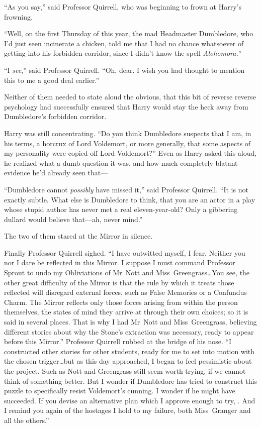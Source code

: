 “As you say,” said Professor Quirrell, who was beginning to frown at Harry’s frowning.

“Well, on the first Thursday of this year, the mad Headmaster Dumbledore, who I’d just seen incinerate a chicken, told me that I had no chance whatsoever of getting into his forbidden corridor, since I didn’t know the spell \emph{Alohomora.}”

“I \emph{see},” said Professor Quirrell. “Oh, dear. I wish you had thought to mention this to me a good deal earlier.”

Neither of them needed to state aloud the obvious, that this bit of reverse reverse psychology had successfully ensured that Harry would stay the heck away from Dumbledore’s forbidden corridor.

Harry was still concentrating. “Do you think Dumbledore suspects that I am, in his terms, a horcrux of Lord Voldemort, or more generally, that some aspects of my personality were copied off Lord Voldemort?” Even as Harry asked this aloud, he realized what a dumb question it was, and how much completely blatant evidence he’d already seen that—

“Dumbledore cannot \emph{possibly} have missed it,” said Professor Quirrell. “It is not exactly subtle. What else is Dumbledore to think, that you are an actor in a play whose stupid author has never met a real eleven-year-old? Only a gibbering dullard would believe that—ah, never mind.”

The two of them stared at the Mirror in silence.

Finally Professor Quirrell sighed. “I have outwitted myself, I fear. Neither you nor I dare be reflected in this Mirror. I suppose I must command Professor Sprout to undo my Obliviations of Mr~Nott and Miss~Greengrass…You see, the other great difficulty of the Mirror is that the rule by which it treats those reflected will disregard external forces, such as False Memories or a Confundus Charm. The Mirror reflects only those forces arising from within the person themselves, the states of mind they arrive at through their own choices; so it is said in several places. That is why I had Mr~Nott and Miss~Greengrass, believing different stories about why the Stone’s extraction was necessary, ready to appear before this Mirror.” Professor Quirrell rubbed at the bridge of his nose. “I constructed other stories for other students, ready for me to set into motion with the chosen trigger…but as this day approached, I began to feel pessimistic about the project. Such as Nott and Greengrass still seem worth trying, if we cannot think of something better. But I wonder if Dumbledore has tried to construct this puzzle to specifically resist Voldemort’s cunning. I wonder if he might have succeeded. If you devise an alternative plan which I approve enough to try, . And I remind you again of the hostages I hold to my failure, both Miss~Granger and all the others.”

